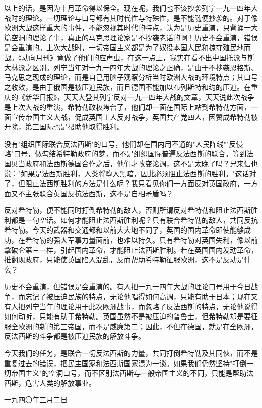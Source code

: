\documentclass[
  openany,           %
  12pt,              %
  a4paper            %
]{ctexbook}
\begin{document}
以上的话，是因为十月革命得以保全。现在呢，我们也不该抄袭列宁一九一四年大战时的理论。一切理论与口号都有其时代性与特殊性，是不能随便抄袭的。对于像欧洲大战这样重大的事件，不能忽视其时代的特点，认为是历史重演，只背诵一大篇空洞的理论了事，真正的马克思理论家是不抄袭老话的啊！历史不会重演，错误是会重演的。上次大战时，一切帝国主义都是为了奴役本国人民和掠夺殖民地而战。《动向月刊》竟做了他们的应声虫，在这一点上，我实在看不出中国托派与斯大林派之区别。列宁当年对一九一四年大战的理论之正确，是由于不抄袭恩格斯、马克思之现成的理论，而是自己用脑子观察分析当时欧洲大战的环境特点；其口号之收效，是由于俄国是被压迫民族，而且德国不能加以布列斯特和约的压迫。在重庆的《新华日报》，天天大登其列宁反对一九一四年大战的文章，天天说此次战争是上次大战的重演，希特勒政权垮台了，他们却一面在国际上站到希特勒方面，一面宣传帝国主义大战，促成英国工人反对战争，英国共产党四人，因赞成希特勒被开除，第三国际也是帮助他取得胜利。

没有"组织国际联合反法西斯"的口号，他们却在国内用不通的"人民阵线""反侵略"口号，做勾结希特勒政府的梦，而不是组织国际普遍反法西斯的联合。等到法国贝当政府和法西斯德国合作之后，他们才改变论调，这不是太晚了吗？兄来信也说："如果是法西斯胜利，人类将堕入黑暗，因此必须阻止法西斯的胜利。"这话对了，但阻止法西斯胜利的方法是什么呢？我只看见你们一方面反对英国政府，一方面又不主张联合英国反抗法西斯，这不是自相矛盾吗？

反对希特勒，便不能同时打倒希特勒的敌人，否则所谓反对希特勒和阻止法西斯胜利都是一句空话。如何才能阻止法西斯胜利呢？只有联合希特勒的敌人，共同反抗希特勒。今天的武器和交通都和以前大大地不同了，英国的国内革命即使能够成功，在希特勒的强大军事力量面前，也难以持久。只有希特勒对英国失利，像以前拿破仑第三一样，引起国内革命，才能阻止法西斯胜利。若在英国国内发动革命，推翻现政府，只能使英国陷入混乱，反而帮助希特勒征服欧洲，这不是反动是什么？

历史不会重演，但错误是会重演的。有人把一九一四年大战的理论口号用于今日战争，而忘记了被压迫民族的特点，无论他唱得如何高调，只能有助于日本；现在又有人把列宁当年的理论用于此次欧洲战事，而忽略了反法西斯的特点，无论他说得如何动听，只能有助于希特勒。英国虽然不是被压迫的普鲁士，但希特勒却是要征服全欧洲的新的第三帝国，而不是威廉第二；因此，不但在德国，就是在全欧洲，反法西斯的斗争都是被压迫民族的解放斗争。

今天我们的任务，是联合一切反法西斯的力量，共同打倒希特勒及其同伙，而不是重复过去的错误，把民主国家和法西斯国家混为一谈。如果我们仍然坚持"打倒一切帝国主义"的空洞口号，而不区别法西斯与一般帝国主义的不同，只能是帮助法西斯，危害人类的解放事业。

\hfill 一九四〇年三月二日
\end{document}
